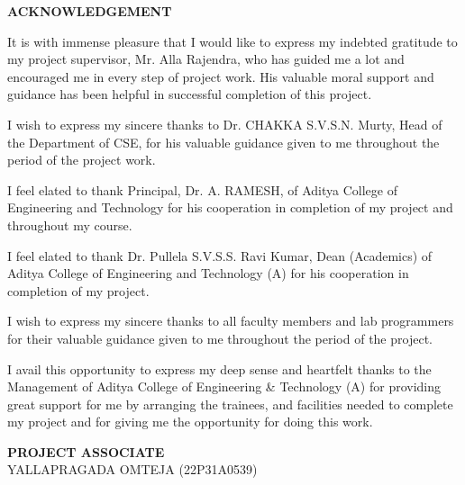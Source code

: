 \begin{center}
{\bfseries\fontsize{16}{18}\selectfont ACKNOWLEDGEMENT}
\end{center}

\vspace{0.5cm}
\noindent
It is with immense pleasure that I would like to express my indebted gratitude to my project supervisor,
Mr. Alla Rajendra, who has guided me a lot and encouraged me in every step of project work.
His valuable moral support and guidance has been helpful in successful completion of this project.

\vspace{0.3cm}

\noindent
I wish to express my sincere thanks to Dr. CHAKKA S.V.S.N. Murty, Head of the Department of CSE,
for his valuable guidance given to me throughout the period of the project work.

\vspace{0.3cm}

\noindent
I feel elated to thank Principal, Dr. A. RAMESH, of Aditya College of Engineering and Technology
for his cooperation in completion of my project and throughout my course.

\vspace{0.3cm}

\noindent
I feel elated to thank Dr. Pullela S.V.S.S. Ravi Kumar, Dean (Academics) of Aditya College of Engineering and Technology (A)
for his cooperation in completion of my project.

\vspace{0.3cm}

\noindent
I wish to express my sincere thanks to all faculty members and lab programmers for their valuable guidance
given to me throughout the period of the project.

\vspace{0.3cm}

\noindent
I avail this opportunity to express my deep sense and heartfelt thanks to the Management of
Aditya College of Engineering \& Technology (A) for providing great support for me by arranging the trainees,
and facilities needed to complete my project and for giving me the opportunity for doing this work.

\vspace{2cm}

\begin{flushright}
\textbf{PROJECT ASSOCIATE}\\[0.5cm]

YALLAPRAGADA OMTEJA (22P31A0539)
\end{flushright}